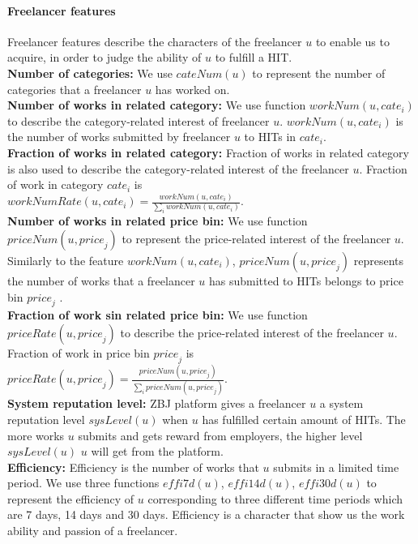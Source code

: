 \documentclass{sig-alternate-05-2015}
\begin{document}
\paragraph{Freelancer features} Freelancer features describe the characters of the freelancer $u$ to enable us to acquire, in order to judge the ability of $u$ to fulfill a HIT.  \\
\textbf{Number of categories:} We use $cateNum(u)$ to represent the number of categories that a freelancer $u$ has worked on. \\
\textbf{ Number of works in related category:}  We use function $workNum(u,{cate}_{i})$ to describe the category-related interest of freelancer $u$. $workNum(u,{cate}_{i})$ is the number of works submitted by freelancer $u$ to HITs in ${cate}_{i}$.\\ 
\textbf{ Fraction of works in related category:} Fraction of works in related category is also used to describe the category-related interest of the freelancer $u$. Fraction of work in category ${cate}_{i}$ is \\ $workNumRate(u,{cate}_{i})= \frac{workNum(u, {cate}_{i})}{\sum _{i}{workNum(u, {cate}_{i})} } $. \\ 
\textbf{ Number of works in related price bin:}  We use function $priceNum(u,{price}_{j})$ to represent the price-related interest of the freelancer $u$. Similarly to the feature $workNum(u,{cate}_{i})$, $priceNum(u,{price}_{j})$ represents the number of works that a freelancer $u$ has submitted to HITs belongs to price bin ${price}_{j}$ .\\
%
\textbf{ Fraction of work sin related price bin:} We use function $priceRate(u,{price}_{j})$ to describe the price-related interest of the freelancer $u$. Fraction of work in price bin ${price}_{j}$ is \\$priceRate(u,{price}_{j})= \frac{priceNum(u,{price}_{j})}{\sum _{i}{priceNum(u,{price}_{j})} }$.\\
\textbf{ System reputation level:} ZBJ platform gives a freelancer $u$ a system reputation level $sysLevel(u)$ when $u$ has fulfilled certain amount of HITs. The more works $u$ submits and gets reward from employers, the higher level $sysLevel(u)$ $u$ will get from the platform. \\
\textbf{ Efficiency:} Efficiency is the number of works that $u$ submits in a limited time period. We use three functions $effi7d(u)$, $effi14d(u)$, $effi30d(u)$ to represent the efficiency of $u$ corresponding to three different time periods which are 7 days, 14 days and 30 days. Efficiency is a character that show us the work ability and passion of a freelancer. \\
\end{document}
